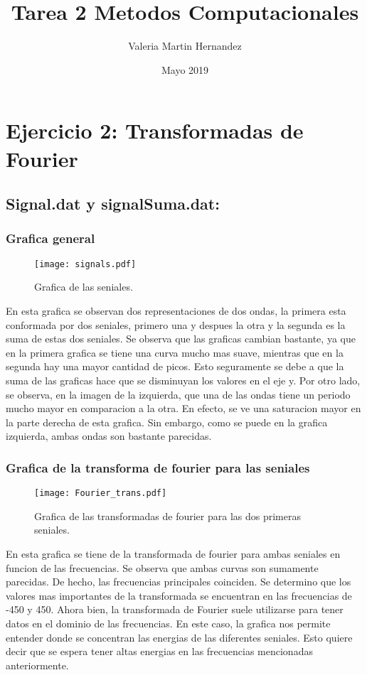 \documentclass[11pt,letterpaper]{exam}
\title{Tarea 2 Metodos Computacionales}
\author{Valeria Martin Hernandez}
\date{Mayo 2019}
\begin{document}
\maketitle
\newpage


\section{Ejercicio 2: Transformadas de Fourier}

\subsection{Signal.dat y signalSuma.dat:}
\subsubsection{Grafica general}
\begin{figure}[H]
    \centering
    \texttt{[image: signals.pdf]}
    \caption{Grafica de las seniales.}
    \label{fig:my_label}
\end{figure}

En esta grafica se observan dos representaciones de dos ondas, la primera esta conformada por dos seniales, primero una y despues la otra y la segunda es la suma de estas dos seniales. Se observa que las graficas cambian bastante, ya que en la primera grafica se tiene una curva mucho mas suave, mientras que en la segunda hay una mayor cantidad de picos. Esto seguramente se debe a que la suma de las graficas hace que se disminuyan los valores en el eje y. Por otro lado, se observa, en la imagen de la izquierda, que una de las ondas tiene un periodo mucho mayor en comparacion a la otra. En efecto, se ve una saturacion mayor en la parte derecha de esta grafica. Sin embargo, como se puede en la grafica izquierda, ambas ondas son bastante parecidas.

\subsubsection{Grafica de la transforma de fourier para las seniales}
\begin{figure}[H]
    \centering
    \texttt{[image: Fourier\_trans.pdf]}
    \caption{Grafica de las transformadas de fourier para las dos primeras seniales.}
    \label{fig:my_label}
\end{figure}
En esta grafica se tiene de la transformada de fourier para ambas seniales en funcion de las frecuencias. Se observa que ambas curvas son sumamente parecidas. De hecho, las frecuencias principales coinciden. Se determino que los valores mas importantes de la transformada se encuentran en las frecuencias de -450 y 450. Ahora bien, la transformada de Fourier suele utilizarse para tener datos en el dominio de las frecuencias. En este caso, la grafica nos permite entender donde se concentran las energias de las diferentes seniales.  Esto quiere decir que se espera tener altas energias en las frecuencias mencionadas anteriormente.
\end{document}
